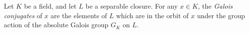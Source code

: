 \documentclass[12pt]{article}
\begin{document}
Let $K$ be a field, and let $L$ be a separable closure. For any $x \in K$, the {\em Galois conjugates} of $x$ are the elements of $L$ which are in the orbit of $x$ under the  group action of the absolute Galois group $G_K$ on $L$.
\end{document}
